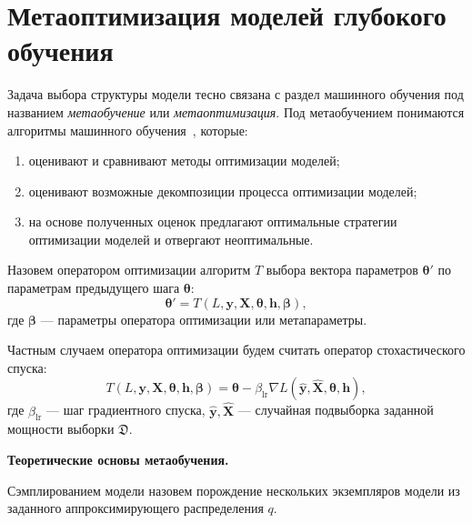 \section{Метаоптимизация моделей глубокого обучения}
Задача выбора структуры модели тесно связана с раздел машинного обучения под названием \textit{метаобучение} или \textit{метаоптимизация}. Под метаобучением понимаются алгоритмы машинного обучения~\cite{metalearn}, которые:
\begin{enumerate}
\item оценивают и сравнивают методы оптимизации моделей;
\item оценивают возможные декомпозиции процесса оптимизации моделей;
\item на основе полученных оценок предлагают оптимальные стратегии оптимизации моделей и отвергают неоптимальные. 
\end{enumerate}

\begin{defin} Назовем оператором оптимизации алгоритм $T$ выбора вектора параметров $\boldsymbol{\theta}'$  по параметрам предыдущего шага $\boldsymbol{\theta}$:
\[
	\boldsymbol{\theta}' = T(L, \mathbf{y}, \mathbf{X}, \boldsymbol{\theta}, \mathbf{h}, \boldsymbol{\beta}),
\]
где $\boldsymbol{\beta}$ --- параметры оператора оптимизации или метапараметры.
\end{defin}



Частным случаем оператора оптимизации будем считать оператор стохастического спуска:
\[
    T(L, \mathbf{y}, \mathbf{X}, \boldsymbol{\theta}, \mathbf{h}, \boldsymbol{\beta}) = \boldsymbol{\theta} - \beta_{\text{lr}} \nabla L(\hat{\mathbf{y}}, \hat{\mathbf{X}}, \boldsymbol{\theta}, \mathbf{h}),
\]
где $\beta_{\text{lr}}$ --- шаг градиентного спуска, $\hat{\mathbf{y}}, \hat{\mathbf{X}}$ --- случайная подвыборка заданной мощности выборки $\mathfrak{D}$.



\par{\textbf{Теоретические основы метаобучения. }}


\begin{defin}
Сэмплированием модели назовем порождение нескольких экземпляров модели из заданного аппроксимирующего распределения $q$.
\end{defin}

